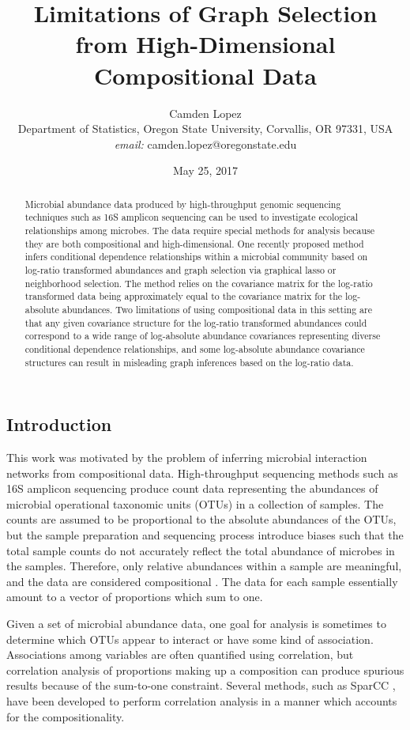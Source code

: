 \documentclass[10pt]{article}
\title{Limitations of Graph Selection from High-Dimensional Compositional Data}
\author{Camden Lopez \\
\small{Department of Statistics, Oregon State University, Corvallis, OR 97331, USA} \\
\small{\textit{email:} camden.lopez@oregonstate.edu}}
\date{May 25, 2017}
\begin{document}
\maketitle

\begin{abstract}
Microbial abundance data produced by high-throughput genomic sequencing techniques such as 16S amplicon sequencing can be used to investigate ecological relationships among microbes. The data require special methods for analysis because they are both compositional and high-dimensional. One recently proposed method infers conditional dependence relationships within a microbial community based on log-ratio transformed abundances and graph selection via graphical lasso or neighborhood selection. The method relies on the covariance matrix for the log-ratio transformed data being approximately equal to the covariance matrix for the log-absolute abundances. Two limitations of using compositional data in this setting are that any given covariance structure for the log-ratio transformed abundances could correspond to a wide range of log-absolute abundance covariances representing diverse conditional dependence relationships, and some log-absolute abundance covariance structures can result in misleading graph inferences based on the log-ratio data.
\end{abstract}

\clearpage
\setcounter{page}{1}

\subsection*{Introduction}

This work was motivated by the problem of inferring microbial interaction networks from compositional data. High-throughput sequencing methods such as 16S amplicon sequencing produce count data representing the abundances of microbial operational taxonomic units (OTUs) in a collection of samples. The counts are assumed to be proportional to the absolute abundances of the OTUs, but the sample preparation and sequencing process introduce biases such that the total sample counts do not accurately reflect the total abundance of microbes in the samples. Therefore, only relative abundances within a sample are meaningful, and the data are considered compositional \cite{gloor,tsilimigras}. The data for each sample essentially amount to a vector of proportions which sum to one.

Given a set of microbial abundance data, one goal for analysis is sometimes to determine which OTUs appear to interact or have some kind of association. Associations among variables are often quantified using correlation, but correlation analysis of proportions making up a composition can produce spurious results because of the sum-to-one constraint. Several methods, such as SparCC \cite{friedmanjon}, have been developed to perform correlation analysis in a manner which accounts for the compositionality.
\end{document}
